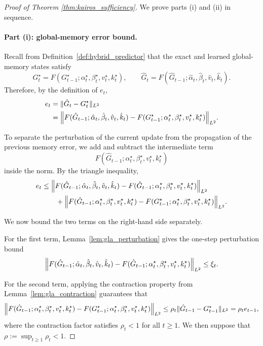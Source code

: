 \begin{proof}[Proof of Theorem \ref{thm:kairos_sufficiency}]
We prove parts \textup{(i)} and \textup{(ii)} in sequence.

\paragraph{Part \textup{(i)}: global-memory error bound.}
Recall from Definition~\ref{def:hybrid_predictor} that the exact and learned global-memory states satisfy
\[
G_t^\star
=
F(G_{t-1}^\star;\alpha_t^\star,\beta_t^\star,v_t^\star,k_t^\star),
\qquad
\hat G_t
=
F(\hat G_{t-1};\hat\alpha_t,\hat\beta_t,\hat v_t,\hat k_t).
\]
Therefore, by the definition of $e_t$,
\begin{align}
e_t
&=
\|\hat G_t-G_t^\star\|_{L^2}
\nonumber\\
&=
\Bigl\|
F(\hat G_{t-1};\hat\alpha_t,\hat\beta_t,\hat v_t,\hat k_t)
-
F(G_{t-1}^\star;\alpha_t^\star,\beta_t^\star,v_t^\star,k_t^\star)
\Bigr\|_{L^2}.
\label{eq:proof_part1_start_refined}
\end{align}

To separate the perturbation of the current update from the propagation of the previous memory error, we add and subtract the intermediate term
\[
F(\hat G_{t-1};\alpha_t^\star,\beta_t^\star,v_t^\star,k_t^\star)
\]
inside the norm. By the triangle inequality,
\begin{align}
e_t
&\le
\Bigl\|
F(\hat G_{t-1};\hat\alpha_t,\hat\beta_t,\hat v_t,\hat k_t)
-
F(\hat G_{t-1};\alpha_t^\star,\beta_t^\star,v_t^\star,k_t^\star)
\Bigr\|_{L^2}
\nonumber\\
&\qquad
+
\Bigl\|
F(\hat G_{t-1};\alpha_t^\star,\beta_t^\star,v_t^\star,k_t^\star)
-
F(G_{t-1}^\star;\alpha_t^\star,\beta_t^\star,v_t^\star,k_t^\star)
\Bigr\|_{L^2}.
\label{eq:add_subtract_global_refined}
\end{align}

We now bound the two terms on the right-hand side separately.

For the first term, Lemma~\ref{lem:gla_perturbation} gives the one-step perturbation bound
\begin{equation}
\Bigl\|
F(\hat G_{t-1};\hat\alpha_t,\hat\beta_t,\hat v_t,\hat k_t)
-
F(\hat G_{t-1};\alpha_t^\star,\beta_t^\star,v_t^\star,k_t^\star)
\Bigr\|_{L^2}
\le
\xi_t.
\label{eq:first_term_bound_refined}
\end{equation}


For the second term, applying the contraction property from Lemma~\ref{lem:gla_contraction} guarantees that
\begin{equation}
\Bigl\|
F(\hat G_{t-1};\alpha_t^\star,\beta_t^\star,v_t^\star,k_t^\star)
-
F(G_{t-1}^\star;\alpha_t^\star,\beta_t^\star,v_t^\star,k_t^\star)
\Bigr\|_{L^2}
\le
\rho_{t} \|\hat G_{t-1}-G_{t-1}^\star\|_{L^2}
=
\rho_{t} e_{t-1},
\label{eq:second_term_bound_refined}
\end{equation}
where the contraction factor satisfies $\rho_t < 1$ for all $t \ge 1$. We then suppose that $\rho := \sup_{t \ge 1} \rho_t < 1$.







\end{proof}
